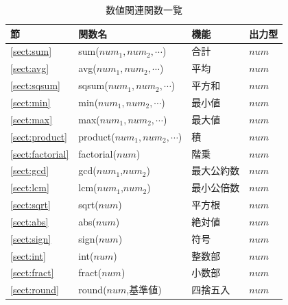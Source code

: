 \begin{table}[!hb]
\begin{center}
\caption{数値関連関数一覧\label{tbl_mcal_func_num}}
{\small
  \begin{tabular}{l|l|l|l} \hline
節&関数名&機能&出力型\\ \hline

\ref{sect:sum}& sum($num_1,num_2,\cdots$)&
合計&
$num$\\

\ref{sect:avg}& avg($num_1,num_2,\cdots$)&
平均&
$num$\\

\ref{sect:sqsum}& sqsum($num_1,num_2,\cdots$)&
平方和&
$num$\\

\ref{sect:min}& min($num_1,num_2,\cdots$)&
最小値&
$num$\\

\ref{sect:max}& max($num_1,num_2,\cdots$)&
最大値&
$num$\\

\ref{sect:product}& product($num_1,num_2,\cdots$)&
積&
$num$\\

\ref{sect:factorial}& factorial($num$)&
階乗&
$num$\\

\ref{sect:gcd}& gcd($num_1$,$num_2$)&
最大公約数&
$num$\\

\ref{sect:lcm}& lcm($num_1$,$num_2$)&
最小公倍数&
$num$\\

\ref{sect:sqrt}& sqrt($num$)&
平方根&
$num$\\

\ref{sect:abs}& abs($num$)&
絶対値&
$num$\\

\ref{sect:sign}& sign($num$)&
符号&
$num$\\

\ref{sect:int}& int($num$)&
整数部&
$num$\\

\ref{sect:fract}& fract($num$)&
小数部&
$num$\\



\ref{sect:round}& round($num$,基準値)&
四捨五入&
$num$\\


\end{tabular}}
\end{center}
\end{table}
